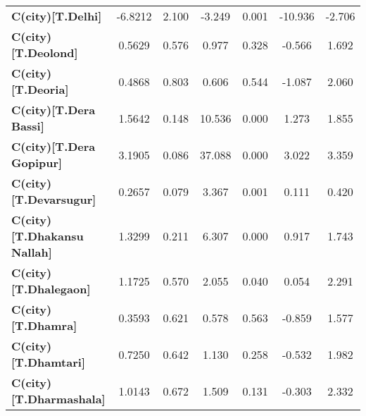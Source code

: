 \begin{center}
\begin{tabular}{lcccccc}
\textbf{C(city)[T.Delhi]}                                                                           &      -6.8212  &        2.100     &    -3.249  &         0.001        &      -10.936    &       -2.706     \\
\textbf{C(city)[T.Deolond]}                                                                         &       0.5629  &        0.576     &     0.977  &         0.328        &       -0.566    &        1.692     \\
\textbf{C(city)[T.Deoria]}                                                                          &       0.4868  &        0.803     &     0.606  &         0.544        &       -1.087    &        2.060     \\
\textbf{C(city)[T.Dera Bassi]}                                                                      &       1.5642  &        0.148     &    10.536  &         0.000        &        1.273    &        1.855     \\
\textbf{C(city)[T.Dera Gopipur]}                                                                    &       3.1905  &        0.086     &    37.088  &         0.000        &        3.022    &        3.359     \\
\textbf{C(city)[T.Devarsugur]}                                                                      &       0.2657  &        0.079     &     3.367  &         0.001        &        0.111    &        0.420     \\
\textbf{C(city)[T.Dhakansu Nallah]}                                                                 &       1.3299  &        0.211     &     6.307  &         0.000        &        0.917    &        1.743     \\
\textbf{C(city)[T.Dhalegaon]}                                                                       &       1.1725  &        0.570     &     2.055  &         0.040        &        0.054    &        2.291     \\
\textbf{C(city)[T.Dhamra]}                                                                          &       0.3593  &        0.621     &     0.578  &         0.563        &       -0.859    &        1.577     \\
\textbf{C(city)[T.Dhamtari]}                                                                        &       0.7250  &        0.642     &     1.130  &         0.258        &       -0.532    &        1.982     \\
\textbf{C(city)[T.Dharmashala]}                                                                     &       1.0143  &        0.672     &     1.509  &         0.131        &       -0.303    &        2.332     \\

\end{tabular}
\end{center}
